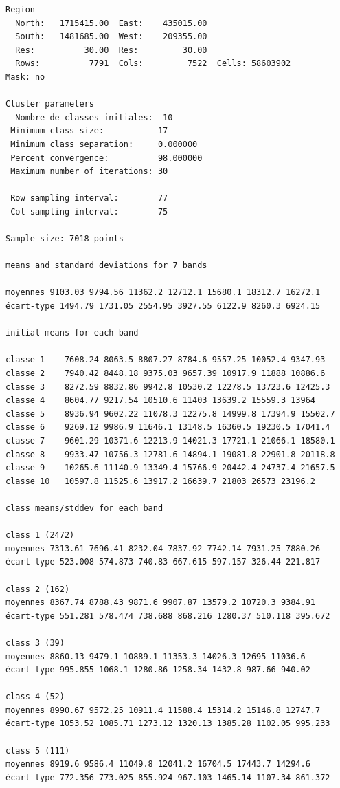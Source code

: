 \documentclass[earth,article,accept,pdftex,moreauthors]{Definitions/mdpi}
\begin{document}
{\begin{scriptsize}
\begin{verbatim}
Region
  North:   1715415.00  East:    435015.00
  South:   1481685.00  West:    209355.00
  Res:          30.00  Res:         30.00
  Rows:          7791  Cols:         7522  Cells: 58603902
Mask: no

Cluster parameters
  Nombre de classes initiales: 	10
 Minimum class size:           17
 Minimum class separation:     0.000000
 Percent convergence:          98.000000
 Maximum number of iterations: 30

 Row sampling interval:        77
 Col sampling interval:        75

Sample size: 7018 points

means and standard deviations for 7 bands

moyennes 9103.03 9794.56 11362.2 12712.1 15680.1 18312.7 16272.1
écart-type 1494.79 1731.05 2554.95 3927.55 6122.9 8260.3 6924.15

initial means for each band

classe 1    7608.24 8063.5 8807.27 8784.6 9557.25 10052.4 9347.93
classe 2    7940.42 8448.18 9375.03 9657.39 10917.9 11888 10886.6
classe 3    8272.59 8832.86 9942.8 10530.2 12278.5 13723.6 12425.3
classe 4    8604.77 9217.54 10510.6 11403 13639.2 15559.3 13964
classe 5    8936.94 9602.22 11078.3 12275.8 14999.8 17394.9 15502.7
classe 6    9269.12 9986.9 11646.1 13148.5 16360.5 19230.5 17041.4
classe 7    9601.29 10371.6 12213.9 14021.3 17721.1 21066.1 18580.1
classe 8    9933.47 10756.3 12781.6 14894.1 19081.8 22901.8 20118.8
classe 9    10265.6 11140.9 13349.4 15766.9 20442.4 24737.4 21657.5
classe 10   10597.8 11525.6 13917.2 16639.7 21803 26573 23196.2

class means/stddev for each band

class 1 (2472)
moyennes 7313.61 7696.41 8232.04 7837.92 7742.14 7931.25 7880.26
écart-type 523.008 574.873 740.83 667.615 597.157 326.44 221.817

class 2 (162)
moyennes 8367.74 8788.43 9871.6 9907.87 13579.2 10720.3 9384.91
écart-type 551.281 578.474 738.688 868.216 1280.37 510.118 395.672

class 3 (39)
moyennes 8860.13 9479.1 10889.1 11353.3 14026.3 12695 11036.6
écart-type 995.855 1068.1 1280.86 1258.34 1432.8 987.66 940.02

class 4 (52)
moyennes 8990.67 9572.25 10911.4 11588.4 15314.2 15146.8 12747.7
écart-type 1053.52 1085.71 1273.12 1320.13 1385.28 1102.05 995.233

class 5 (111)
moyennes 8919.6 9586.4 11049.8 12041.2 16704.5 17443.7 14294.6
écart-type 772.356 773.025 855.924 967.103 1465.14 1107.34 861.372


\end{verbatim}
\end{scriptsize}}
\end{document}
